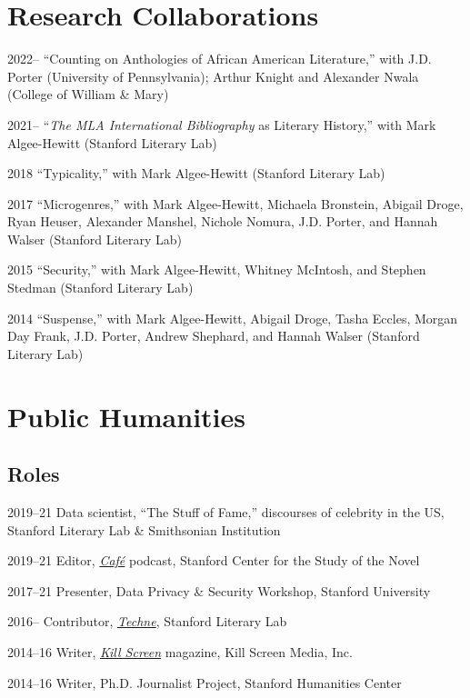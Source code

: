 \documentclass[12pt,letterpaper]{report}
\begin{document}
\section*{Research Collaborations}

\begin{tablist}
	\item[2022--] \tab{}\enquote{Counting on Anthologies of African American Literature,} with J.D. Porter (University of Pennsylvania); Arthur Knight and Alexander Nwala (College of William \& Mary)
	\item[2021--] \tab{}\enquote{\emph{The MLA International Bibliography} as Literary History,} with Mark Algee-Hewitt (Stanford Literary Lab)
	\item[2018] \tab{}\enquote{Typicality,} with Mark Algee-Hewitt (Stanford Literary Lab)
	\item[2017] \tab{}\enquote{Microgenres,} with Mark Algee-Hewitt, Michaela Bronstein, Abigail Droge, Ryan Heuser, Alexander Manshel, Nichole Nomura, J.D. Porter, and Hannah Walser (Stanford Literary Lab)
	\item[2015] \tab{}\enquote{Security,} with Mark Algee-Hewitt, Whitney McIntosh, and Stephen Stedman (Stanford Literary Lab)
	\item[2014] \tab{}\enquote{Suspense,} with Mark Algee-Hewitt, Abigail Droge, Tasha Eccles, Morgan Day Frank, J.D. Porter, Andrew Shephard, and Hannah Walser (Stanford Literary Lab)
\end{tablist}

\section*{Public Humanities}

\subsection*{Roles}

\begin{tablist}
	\item[2019--21] \tab{}Data scientist, \enquote{The Stuff of Fame,} discourses of celebrity in the US, Stanford Literary Lab \& Smithsonian Institution
	\item[2019--21] \tab{}Editor, \href{https://novel.stanford.edu/csn-cafe}{\emph{Café}} podcast, Stanford Center for the Study of the Novel
	\item[2017--21] \tab{}Presenter, Data Privacy \& Security Workshop, Stanford University
	\item[2016--] \tab{}Contributor, \href{https://litlab.stanford.edu/techne/}{\emph{Techne}}, Stanford Literary Lab
	\item[2014--16] \tab{}Writer, \href{https://web.archive.org/web/20221003115514/https://killscreen.com/previously/author/erik-fredner/}{\emph{Kill Screen}} magazine, Kill Screen Media, Inc.
	\item[2014--16] \tab{}Writer, Ph.D. Journalist Project, Stanford Humanities Center
\end{tablist}
\end{document}
